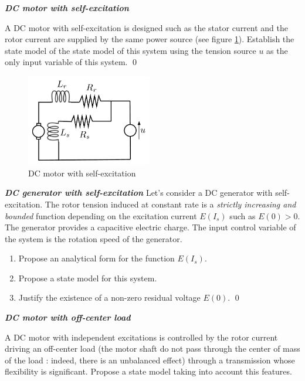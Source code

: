 \begin{exercice}{\bf \em DC motor with self-excitation}

A DC motor with self-excitation is designed such as the stator 
current and the rotor current are supplied by the same power source
(see figure \ref{fig:autoex}). Establish the state model of the state model 
of this system using the tension source $u$ as the only input 
variable of this system. \qed
\begin{figure}[htbp]
\begin{center}
\includegraphics[height=4cm]{autoex}
\caption{DC motor with self-excitation}
\label{fig:autoex}
\end{center}
\end{figure}
\end{exercice}
\vv

\begin{exercice}{\bf \em DC generator with self-excitation}
Let's consider a DC generator with self-excitation. The rotor tension 
induced at constant rate is a {\em strictly  increasing and bounded} function 
depending on the excitation current $E(I_s)$ such as $E(0) >
0$. The generator provides a capacitive electric charge. 
The input control variable of the system is the rotation speed of 
the generator. 
\begin{enumerate}
\item Propose an analytical form for the function $E(I_s)$.
\item Propose a state model for this system.
\item Justify the existence of a non-zero residual voltage $E(0)$. \qed
\end{enumerate}
\end{exercice}
\vv

\begin{exercice}{\bf \em DC motor with off-center load}

A DC motor with independent excitations is controlled by the rotor current
driving an off-center load (the motor shaft do not pass through the 
center of mass of the load : indeed, there is an unbalanced effect)
through a transmission whose flexibility is significant. 
Propose a state model taking into account this features. 
\end{exercice}
\vv

